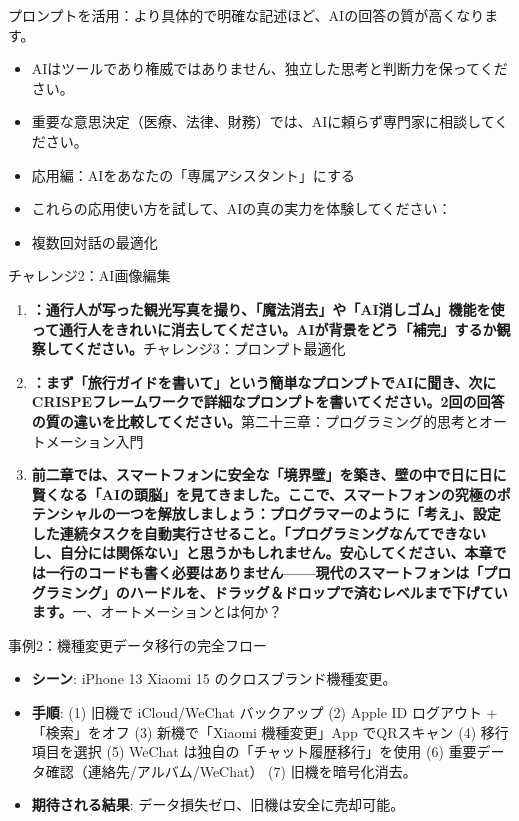 \begin{tcbinfo}{プロンプトを活用：より具体的で明確な記述ほど、AIの回答の質が高くなります。}
\begin{itemize}
  \item AIはツールであり権威ではありません、独立した思考と判断力を保ってください。
  \item 重要な意思決定（医療、法律、財務）では、AIに頼らず専門家に相談してください。
  \item 応用編：AIをあなたの「専属アシスタント」にする
  \item これらの応用使い方を試して、AIの真の実力を体験してください：
  \item 複数回対話の最適化
\end{itemize}

\end{tcbinfo}

\begin{tcbpractice}{チャレンジ2：AI画像編集}
\begin{enumerate}
  \item \textbf{：通行人が写った観光写真を撮り、「魔法消去」や「AI消しゴム」機能を使って通行人をきれいに消去してください。AIが背景をどう「補完」するか観察してください。}チャレンジ3：プロンプト最適化
  \item \textbf{：まず「旅行ガイドを書いて」という簡単なプロンプトでAIに聞き、次にCRISPEフレームワークで詳細なプロンプトを書いてください。2回の回答の質の違いを比較してください。}第二十三章：プログラミング的思考とオートメーション入門
  \item \textbf{前二章では、スマートフォンに安全な「境界壁」を築き、壁の中で日に日に賢くなる「AIの頭脳」を見てきました。ここで、スマートフォンの究極のポテンシャルの一つを解放しましょう：プログラマーのように「考え」、設定した連続タスクを自動実行させること。「プログラミングなんてできないし、自分には関係ない」と思うかもしれません。安心してください、本章では一行のコードも書く必要はありません——現代のスマートフォンは「プログラミング」のハードルを、ドラッグ＆ドロップで済むレベルまで下げています。}一、オートメーションとは何か？
\end{enumerate}

\end{tcbpractice}

\begin{tcbinfo}{事例2：機種変更データ移行の完全フロー}
\begin{itemize}
  \item \textbf{シーン}: iPhone 13 Xiaomi 15 のクロスブランド機種変更。
  \item \textbf{手順}: (1) 旧機で iCloud/WeChat バックアップ (2) Apple ID ログアウト +「検索」をオフ (3) 新機で「Xiaomi 機種変更」App でQRスキャン (4) 移行項目を選択 (5) WeChat は独自の「チャット履歴移行」を使用 (6) 重要データ確認（連絡先/アルバム/WeChat） (7) 旧機を暗号化消去。
  \item \textbf{期待される結果}: データ損失ゼロ、旧機は安全に売却可能。
\end{itemize}

\end{tcbinfo}
